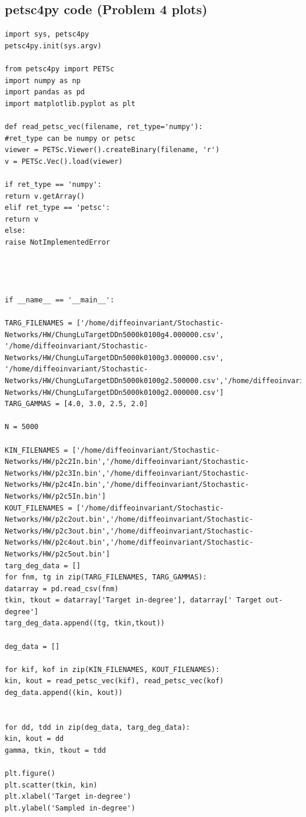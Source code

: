 \documentclass[11pt]{article}
\begin{document}
\subsection*{petsc4py code (Problem 4 plots)}
\begin{Verbatim}
import sys, petsc4py
petsc4py.init(sys.argv)

from petsc4py import PETSc
import numpy as np
import pandas as pd
import matplotlib.pyplot as plt

def read_petsc_vec(filename, ret_type='numpy'):
#ret_type can be numpy or petsc
viewer = PETSc.Viewer().createBinary(filename, 'r')
v = PETSc.Vec().load(viewer)

if ret_type == 'numpy':
return v.getArray()
elif ret_type == 'petsc':
return v
else:
raise NotImplementedError




if __name__ == '__main__':

TARG_FILENAMES = ['/home/diffeoinvariant/Stochastic-Networks/HW/ChungLuTargetDDn5000k0100g4.000000.csv', '/home/diffeoinvariant/Stochastic-Networks/HW/ChungLuTargetDDn5000k0100g3.000000.csv', '/home/diffeoinvariant/Stochastic-Networks/HW/ChungLuTargetDDn5000k0100g2.500000.csv','/home/diffeoinvariant/Stochastic-Networks/HW/ChungLuTargetDDn5000k0100g2.000000.csv']
TARG_GAMMAS = [4.0, 3.0, 2.5, 2.0]

N = 5000

KIN_FILENAMES = ['/home/diffeoinvariant/Stochastic-Networks/HW/p2c2In.bin','/home/diffeoinvariant/Stochastic-Networks/HW/p2c3In.bin','/home/diffeoinvariant/Stochastic-Networks/HW/p2c4In.bin','/home/diffeoinvariant/Stochastic-Networks/HW/p2c5In.bin']
KOUT_FILENAMES = ['/home/diffeoinvariant/Stochastic-Networks/HW/p2c2out.bin','/home/diffeoinvariant/Stochastic-Networks/HW/p2c3out.bin','/home/diffeoinvariant/Stochastic-Networks/HW/p2c4out.bin','/home/diffeoinvariant/Stochastic-Networks/HW/p2c5out.bin']
targ_deg_data = []
for fnm, tg in zip(TARG_FILENAMES, TARG_GAMMAS):
datarray = pd.read_csv(fnm)
tkin, tkout = datarray['Target in-degree'], datarray[' Target out-degree']
targ_deg_data.append((tg, tkin,tkout))

deg_data = []

for kif, kof in zip(KIN_FILENAMES, KOUT_FILENAMES):
kin, kout = read_petsc_vec(kif), read_petsc_vec(kof)
deg_data.append((kin, kout))


for dd, tdd in zip(deg_data, targ_deg_data):
kin, kout = dd
gamma, tkin, tkout = tdd

plt.figure()
plt.scatter(tkin, kin)
plt.xlabel('Target in-degree')
plt.ylabel('Sampled in-degree')


\end{Verbatim}
\end{document}
